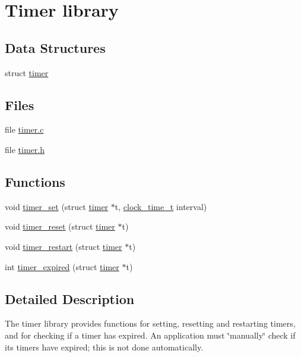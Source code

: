 \hypertarget{group__timer}{
\section{Timer library}
\label{group__timer}
}
\subsection*{Data Structures}
\begin{DoxyCompactItemize}
\item 
struct \hyperlink{structtimer}{timer}
\end{DoxyCompactItemize}
\subsection*{Files}
\begin{DoxyCompactItemize}
\item 
file \hyperlink{uip_2timer_8c}{timer.c}
\item 
file \hyperlink{uip_2timer_8h}{timer.h}
\end{DoxyCompactItemize}
\subsection*{Functions}
\begin{DoxyCompactItemize}
\item 
void \hyperlink{group__timer_ga6614d96fdfcd95c95ec6e6f63071ff51}{timer\_\-set} (struct \hyperlink{structtimer}{timer} $\ast$t, \hyperlink{clock-arch_8h_a42fc7b708ad04499c436158fd5f37ed4}{clock\_\-time\_\-t} interval)
\item 
void \hyperlink{group__timer_gaedaf3e48c2b04229b85455fb948468d6}{timer\_\-reset} (struct \hyperlink{structtimer}{timer} $\ast$t)
\item 
void \hyperlink{group__timer_gacb807bd57e5489b386b876af5c1f163a}{timer\_\-restart} (struct \hyperlink{structtimer}{timer} $\ast$t)
\item 
int \hyperlink{group__timer_ga6d71dececfce707c668e6257aad5906e}{timer\_\-expired} (struct \hyperlink{structtimer}{timer} $\ast$t)
\end{DoxyCompactItemize}


\subsection{Detailed Description}
The timer library provides functions for setting, resetting and restarting timers, and for checking if a timer has expired. An application must \char`\"{}manually\char`\"{} check if its timers have expired; this is not done automatically.

